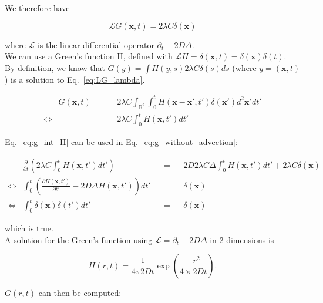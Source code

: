 We therefore have 

\begin{equation}
\mathcal{L}G(\boldsymbol{x},t)=2\lambda C\delta(\boldsymbol{x})\label{eq:LG_lambda}
\end{equation}

where $\mathcal{L}$ is the linear differential operator $\partial_{t}-2D\Delta$. \\

We can use a Green's function H, defined with $\mathcal{L}H=\delta(\boldsymbol{x},t)=\delta(\boldsymbol{x})\delta(t)$. \\

By definition, we know that $G(y)=\int H(y,s)2\lambda C\delta(s)ds$
(where $y=(\boldsymbol{x},t)$) is a solution to Eq.~\ref{eq:LG_lambda}.

\begin{align}
 & G(\boldsymbol{x},t) & = & & 2\lambda C\int_{\mathbb{R}^{2}}\int_{0}^{t}H(\boldsymbol{x}-\boldsymbol{x}',t')\delta(\boldsymbol{x}')d^2\boldsymbol{x}'dt'\nonumber \\
\Leftrightarrow &  & = &  & 2\lambda C\int_{0}^{t}H(\boldsymbol{x},t')dt'\label{eq:g_int_H}
\end{align}

Eq.~\ref{eq:g_int_H} can be used in Eq.~\ref{eq:g_without_advection}:

\begin{align}
 & \frac{\partial}{\partial t}\left(2\lambda C\int_{0}^{t}H(\boldsymbol{x},t')dt'\right) & & = & & 2D2\lambda C\Delta\int_{0}^{t}H(\boldsymbol{x},t')dt'+2\lambda C\delta(\boldsymbol{x})\\
\Leftrightarrow & \int_{0}^{t}\left(\frac{\partial H(\boldsymbol{x},t')}{\partial t'}-2D\Delta H(\boldsymbol{x},t')\right)dt' & & = & & \delta(\boldsymbol{x})\\
\Leftrightarrow & \int_{0}^{t}\delta(\boldsymbol{x})\delta(t')dt' & & = & & \delta(\boldsymbol{x})
\end{align}

which is true. \\

A solution for the Green's function using $\mathcal{L}=\partial_{t}-2D\Delta$
in 2 dimensions is 

\begin{equation}
H(r,t)=\frac{1}{4\pi2Dt}\exp\left(\frac{-r^{2}}{4\times2Dt}\right). 
\end{equation}

$G(r,t)$ can then be computed:


